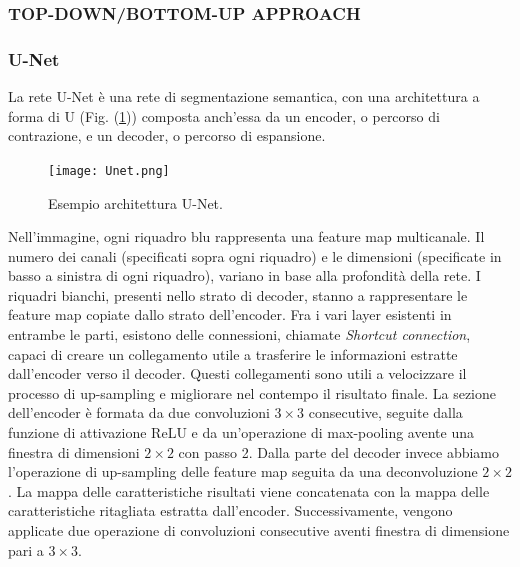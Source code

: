 \subsubsection{TOP-DOWN/BOTTOM-UP APPROACH}
\subsubsection{U-Net}
La rete U-Net \cite{unet} è una rete di segmentazione semantica, con una architettura a forma 
di U (Fig. (\ref{unet})) composta anch'essa da un encoder, o percorso di contrazione, e 
un decoder, o percorso di espansione.
\begin{figure}
    \centering
    \texttt{[image: Unet.png]}
    \centering
    \caption{Esempio architettura U-Net.}
    \label{unet}
\end{figure}
Nell'immagine, ogni riquadro blu rappresenta una feature map multicanale. Il 
numero dei canali (specificati sopra ogni riquadro) e le dimensioni (specificate in 
basso a sinistra di ogni riquadro), variano in base alla profondità della rete. I 
riquadri bianchi, presenti nello strato di decoder, stanno a rappresentare le feature 
map copiate dallo strato dell'encoder. Fra i vari layer esistenti in entrambe le 
parti, esistono delle connessioni, chiamate \emph{Shortcut connection}, capaci di creare 
un collegamento utile a trasferire le informazioni estratte dall'encoder verso il 
decoder. Questi collegamenti sono utili a velocizzare il processo di up-sampling e 
migliorare nel contempo il risultato finale. La sezione dell'encoder è formata da 
due convoluzioni $3 \times 3$ consecutive, seguite dalla funzione di attivazione ReLU e 
da un'operazione di max-pooling avente una finestra di dimensioni $2 \times 2$ con 
passo 2. Dalla parte del decoder invece abbiamo l'operazione di up-sampling delle 
feature map seguita da una deconvoluzione $2 \times 2$. La mappa delle caratteristiche 
risultati viene concatenata con la mappa delle caratteristiche ritagliata estratta 
dall'encoder. Successivamente, vengono applicate due operazione di convoluzioni 
consecutive aventi finestra di dimensione pari a $3 \times 3$.

